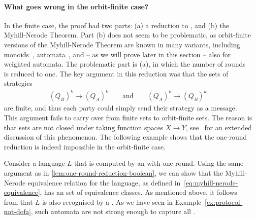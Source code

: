 \paragraph*{What goes wrong in the orbit-finite case?}
In the finite case, the proof had two parts: (a) a reduction to , and (b) the Myhill-Nerode Theorem.
Part (b) does not seem to be problematic, as orbit-finite versions of the Myhill-Nerode Theorem are known in many variants, 
including monoids~\cite[Lemma 3.3]{bojanczykNominalMonoids2013}, automata~\cite[Section 3.2]{bojanczykAutomataTheoryNominal2014}, 
and -- as we will prove later in this section -- also for weighted automata. 
The problematic part is (a), in which the number of rounds is reduced to one.
The key argument in this reduction  was that the sets of strategies 
  \begin{align*}
    (Q_B)^k \to (Q_A)^k \qquad \text{and} \qquad (Q_A)^k \to (Q_B)^k
    \end{align*}
are finite, and thus each party could simply send their strategy as a message.
This argument fails to carry over from finite sets to orbit-finite sets. 
The reason is that  sets are not closed under taking function spaces $X \to Y$, see~\cite{functionSpaces2024} 
for an extended discussion of this phenomenon.
The following example shows that the one-round reduction 
is indeed impossible in the orbit-finite case.

\begin{myexample}
    \label{ex:no-one-round-reduction}
    Consider a language $L$ that is computed by an  with
    one round. Using the same argument as in
    \cref{lem:one-round-reduction-boolean}, we can show that the Myhill-Nerode
    equivalence relation for the language, as defined
    in~\eqref{eq:myhill-nerode-equivalence}, has an  set of
    equivalence classes. As mentioned above, it follows from \cite[Section
    3.2]{bojanczykAutomataTheoryNominal2014} that $L$ is also recognised by a
    . As we have seen in
    Example~\ref{ex:protocol-not-dofa}, such automata are not strong enough to
    capture all .
\end{myexample}

